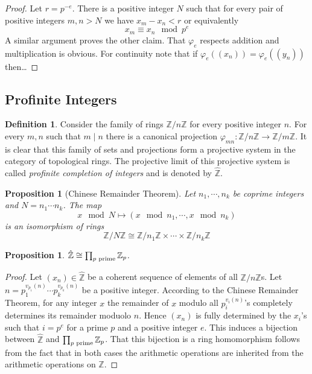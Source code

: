 \documentclass[12pt]{article}
\newtheorem{prop}[thm]{Proposition}
\theoremstyle{definition}
\newtheorem{dfn}[thm]{Definition}
\theoremstyle{remark}
\newcommand{\zee}{\mathbb{Z}}
\newcommand{\zeehat}{\hat{\mathbb{Z}}}
\begin{document}
    \begin{proof}
        Let $r=p^{-e}$. There is a positive integer $N$ such that for every pair of positive integers $m,n> N$ we have $x_m-x_n<r$ or equivalently
        $$x_m\equiv x_n \mod p^e$$
        A similar argument proves the other claim. That $\varphi_e$ respects addition and multiplication is obvious. For continuity note that if $\varphi_e((x_n))=\varphi_e((y_n))$ then\ldots %
    \end{proof}

    \subsection{Profinite Integers}

    \begin{dfn}
        Consider the family of rings $\zee/n\zee$ for every positive integer $n$. For every $m,n$ such that $m\mid n$ there is a canonical projection $\varphi_{mn}\colon\zee/n\zee\to\zee/m\zee$. It is clear that this family of sets and projections form a projective system in the category of topological rings. The projective limit of this projective system is called \emph{profinite completion of integers} and is denoted by $\zeehat$.
    \end{dfn}

    \begin{prop}[Chinese Remainder Theorem]
        Let $n_1,\cdots,n_k$ be coprime integers and $N=n_1\cdots n_k$. The map
        $$x \mod N \mapsto (x \mod n_1,\cdots,x \mod n_k)$$
        is an isomorphism of rings
        $$\mathbb{Z}/N\mathbb{Z}\cong \mathbb{Z}/n_1\mathbb{Z}\times\cdots\times\mathbb{Z}/n_k\mathbb{Z}$$
    \end{prop}

    \begin{prop}
        $\zeehat\cong\prod_{p\textup{ prime}}\zee_p$.
    \end{prop}

    \begin{proof}
        Let $(x_n)\in\zeehat$ be a coherent sequence of elements of all $\zee/n\zee$s. Let $n=p_1^{v_{p_1}(n)}\cdots p_k^{v_{p_k}(n)}$ be a positive integer. According to the Chinese Remainder Theorem, for any integer $x$ the remainder of $x$ modulo all $p_i^{{v_i}(n)}$'s completely determines its remainder moduolo $n$. Hence $(x_n)$ is fully determined by the $x_i$'s such that $i=p^e$ for a prime $p$ and a positive integer $e$. This induces a bijection between $\zeehat$ and $\prod_{p\textup{ prime}}\zee_p$. That this bijection is a ring homomorphism follows from the fact that in both cases the arithmetic operations are inherited from the arithmetic operations on $\zee$.
    \end{proof}
\end{document}
